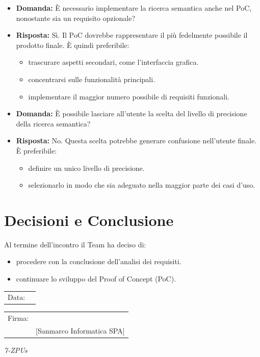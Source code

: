 \documentclass[a4paper,12pt]{article}
\begin{document}
\begin{itemize}[label={}]
    \item \textbf{Domanda:} È necessario implementare la ricerca semantica anche nel PoC, nonostante sia un requisito opzionale?
    
    \item \textbf{Risposta:} Sì. Il PoC dovrebbe rappresentare il più fedelmente possibile il prodotto finale.  
    È quindi preferibile:
    \begin{itemize}[label={•}]
        \item trascurare aspetti secondari, come l’interfaccia grafica.
        \item concentrarsi sulle funzionalità principali.
        \item implementare il maggior numero possibile di requisiti funzionali.
    \end{itemize}
\end{itemize}


\begin{itemize}[label={}]
    \item \textbf{Domanda:} È possibile lasciare all’utente la scelta del livello di precisione della ricerca semantica?
    
    \item \textbf{Risposta:} No. Questa scelta potrebbe generare confusione nell’utente finale.  
    È preferibile:
    \begin{itemize}[label={•}]
        \item definire un unico livello di precisione.
        \item selezionarlo in modo che sia adeguato nella maggior parte dei casi d’uso.
    \end{itemize}
\end{itemize}

\section{Decisioni e Conclusione}

Al termine dell’incontro il Team ha deciso di:
\begin{itemize}
    \item procedere con la conclusione dell’analisi dei requisiti.
    \item continuare lo sviluppo del Proof of Concept (PoC).
\end{itemize}

\vfill


\begin{flushleft}
\begin{tabular}{@{}p{0.5in}p{2in}@{}}
Data: & \hrulefill \\
\end{tabular}

\vspace{1em}

\begin{tabular}{@{}p{0.5in}p{2in}@{}}
Firma: & \hrulefill \\
& [Sanmarco Informatica SPA] \\
\end{tabular}
\end{flushleft}

\begin{flushright}
    \textit{7-ZPUs}
\end{flushright}
\end{document}
